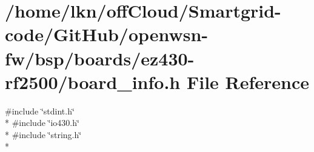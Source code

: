 \hypertarget{ez430-rf2500_2board__info_8h}{}\section{/home/lkn/off\+Cloud/\+Smartgrid-\/code/\+Git\+Hub/openwsn-\/fw/bsp/boards/ez430-\/rf2500/board\+\_\+info.h File Reference}
\label{ez430-rf2500_2board__info_8h}
{\ttfamily \#include \char`\"{}stdint.\+h\char`\"{}}\\*
{\ttfamily \#include \char`\"{}io430.\+h\char`\"{}}\\*
{\ttfamily \#include \char`\"{}string.\+h\char`\"{}}\\*
